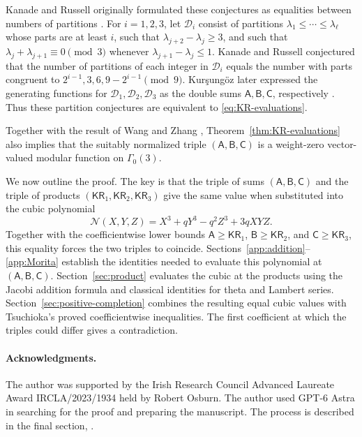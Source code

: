 \documentclass[11pt]{article}
\numberwithin{equation}{section}
\theoremstyle{remark}
\newcommand{\KR}{\mathsf{KR}}
\begin{document}
Kanade and Russell originally formulated these conjectures as equalities
between numbers of partitions \cite{KanadeRussell2015}. For \(i=1,2,3\),
let \(\mathcal D_i\) consist of partitions
\(\lambda_1\leq\cdots\leq\lambda_\ell\) whose parts are at least
\(i\), such that
\(\lambda_{j+2}-\lambda_j\geq3\), and such that
\(\lambda_j+\lambda_{j+1}\equiv0\pmod3\) whenever
\(\lambda_{j+1}-\lambda_j\leq1\).
Kanade and Russell conjectured that the
number of partitions of each integer in \(\mathcal D_i\) equals the number
with parts congruent to \(2^{i-1},3,6,9-2^{i-1}\pmod9\).
Kur\c{s}ung\"oz later expressed the generating functions for
\(\mathcal D_1,\mathcal D_2,\mathcal D_3\) as the double sums
\(\mathsf A,\mathsf B,\mathsf C\), respectively
\cite[Theorems 7--9]{Kursungoz2019}.
Thus these partition conjectures are equivalent to
\eqref{eq:KR-evaluations}.

Together with the result of Wang and Zhang
\cite[Theorem 1.1]{WangZhang2025}, Theorem~\ref{thm:KR-evaluations}
also implies that the suitably normalized triple
\((\mathsf A,\mathsf B,\mathsf C)\) is a weight-zero vector-valued
modular function on \(\Gamma_0(3)\).

We now outline the proof. The key is that the triple of sums \((\mathsf A,\mathsf B,\mathsf C)\)
and the triple of products \((\KR_1,\KR_2,\KR_3)\) give the same value
when substituted into the cubic polynomial
\[
 \mathcal N(X,Y,Z)=X^3+qY^3-q^2Z^3+3qXYZ.
\]
Together with the coefficientwise lower bounds
\(\mathsf A\geq\KR_1\), \(\mathsf B\geq\KR_2\), and
\(\mathsf C\geq\KR_3\), this equality forces the two triples to coincide.
Sections~\ref{app:addition}--\ref{app:Morita} establish the
identities needed to evaluate this polynomial at \((\mathsf A,\mathsf B,\mathsf C)\).
Section~\ref{sec:product} evaluates the cubic at the products using
the Jacobi addition formula and classical identities for theta and Lambert series. Section~\ref{sec:positive-completion}
combines the resulting equal cubic values with Tsuchioka's proved
coefficientwise inequalities. The first coefficient at which the
triples could differ gives a contradiction.

\paragraph*{Acknowledgments.}
The author was supported by the Irish Research Council Advanced Laureate Award
IRCLA/2023/1934 held by Robert Osburn.
The author used GPT-6 Astra in searching for the proof and preparing the manuscript.
The process is described in the final section, .
\end{document}
